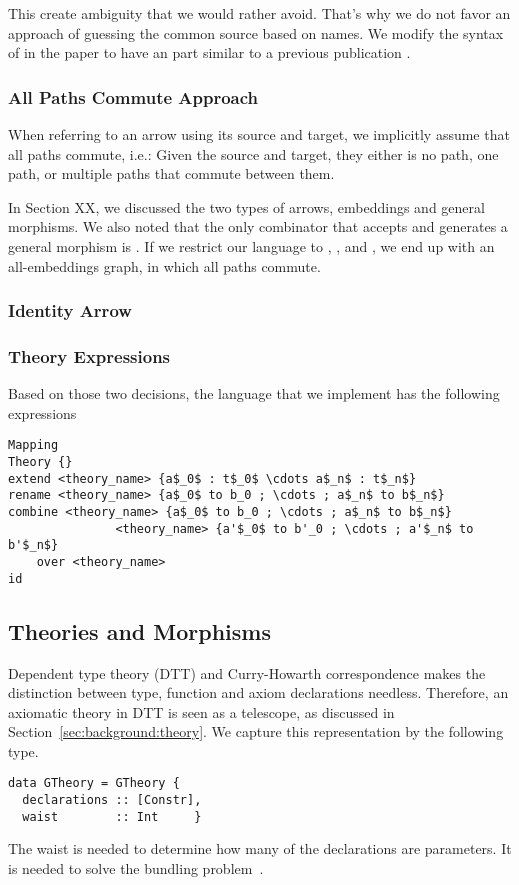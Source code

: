 This create ambiguity that we would rather avoid. That's why we do not favor an approach of guessing the common source based on names. We modify the syntax of  in the paper to have an  part similar to a previous publication \cite{CaretteOConnorTPC}. 

\subsubsection{All Paths Commute Approach} 
When referring to an arrow using its source and target, we implicitly assume that all paths commute, i.e.: Given the source and target, they either is no path, one path, or multiple paths that commute between them. 

In Section XX, we discussed the two types of arrows, embeddings and general morphisms. We also noted that the only combinator that accepts and generates a general morphism is . If we restrict our language to , , and , we end up with an all-embeddings graph, in which all paths commute.

\subsubsection{Identity Arrow}

\subsubsection{Theory Expressions}
\label{sec:impl:expressions}
Based on those two decisions, the language that we implement has the following expressions
\begin{lstlisting}[mathescape]
Mapping
Theory {}
extend <theory_name> {a$_0$ : t$_0$ \cdots a$_n$ : t$_n$}
rename <theory_name> {a$_0$ to b_0 ; \cdots ; a$_n$ to b$_n$}
combine <theory_name> {a$_0$ to b_0 ; \cdots ; a$_n$ to b$_n$}
               <theory_name> {a'$_0$ to b'_0 ; \cdots ; a'$_n$ to b'$_n$}
    over <theory_name>
id     
\end{lstlisting} 


\subsection{Theories and Morphisms}
Dependent type theory (DTT) and Curry-Howarth correspondence makes the distinction between type, function and axiom declarations needless. Therefore, an axiomatic theory in DTT is seen as a telescope, as discussed in Section~\ref{sec:background:theory}. We capture this representation by the following type. 
\begin{verbatim}
data GTheory = GTheory {
  declarations :: [Constr],
  waist        :: Int     }
\end{verbatim}
The waist is needed to determine how many of the declarations are parameters. It is needed to solve the bundling problem~\cite{alhassy2019}. 

